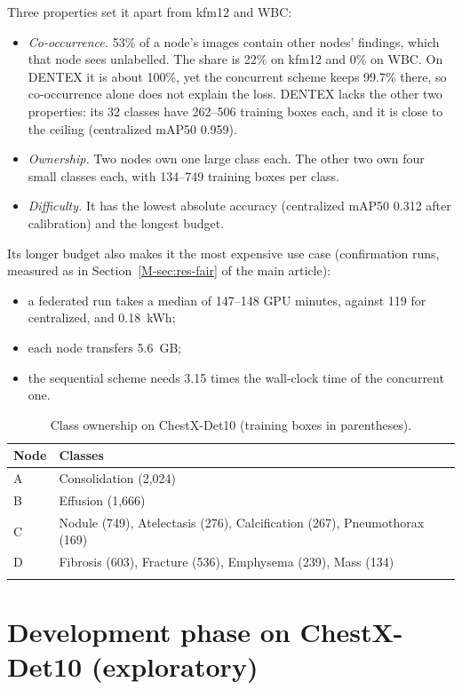 \documentclass[pdflatex,sn-mathphys-num]{sn-jnl}
\begin{document}
Three properties set it apart from kfm12 and WBC:
\begin{itemize}
\item \emph{Co-occurrence.} 53\% of a node's images contain other nodes' findings, which that node sees unlabelled. The share is 22\% on kfm12 and 0\% on WBC. On DENTEX it is about 100\%, yet the concurrent scheme keeps 99.7\% there, so co-occurrence alone does not explain the loss. DENTEX lacks the other two properties: its 32 classes have 262--506 training boxes each, and it is close to the ceiling (centralized mAP50 0.959).
\item \emph{Ownership.} Two nodes own one large class each. The other two own four small classes each, with 134--749 training boxes per class.
\item \emph{Difficulty.} It has the lowest absolute accuracy (centralized mAP50 0.312 after calibration) and the longest budget.
\end{itemize}
Its longer budget also makes it the most expensive use case (confirmation runs, measured as in Section~\ref{M-sec:res-fair} of the main article):
\begin{itemize}
\item a federated run takes a median of 147--148 GPU minutes, against 119 for centralized, and 0.18~kWh;
\item each node transfers 5.6~GB;
\item the sequential scheme needs 3.15 times the wall-clock time of the concurrent one.
\end{itemize}

\begin{table}[h]
\caption{Class ownership on ChestX-Det10 (training boxes in parentheses).}\label{tab:s-owners}
\footnotesize
\begin{tabular*}{\textwidth}{@{\extracolsep\fill}ll}
\toprule
Node & Classes \\
\midrule
A & Consolidation (2,024) \\
B & Effusion (1,666) \\
C & Nodule (749), Atelectasis (276), Calcification (267), Pneumothorax (169) \\
D & Fibrosis (603), Fracture (536), Emphysema (239), Mass (134) \\
\botrule
\end{tabular*}
\end{table}

\section{Development phase on ChestX-Det10 (exploratory)}\label{sec:s-dev}
\end{document}
